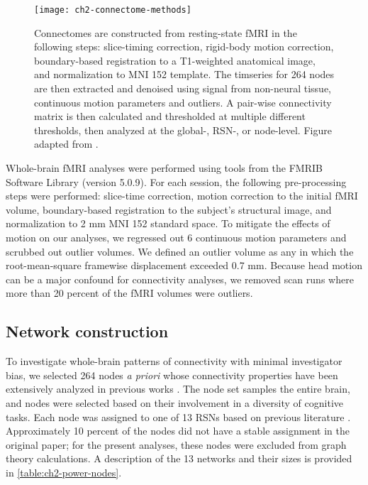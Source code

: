 \begin{figure}[t]
    \centering
    \texttt{[image: ch2-connectome-methods]}
    \caption[Schematic for connectome construction.]{Connectomes are constructed from resting-state fMRI in the following steps: slice-timing correction, rigid-body motion correction, boundary-based registration to a T1-weighted anatomical image, and normalization to MNI 152 template. The timseries for 264 nodes are then extracted and denoised using signal from non-neural tissue, continuous motion parameters and outliers. A pair-wise connectivity matrix is then calculated and thresholded at multiple different thresholds, then analyzed at the global-, RSN-, or node-level. Figure adapted from \citep{Yang2018}.}
    \label{fig:ch2-connectome-methods}
\end{figure}

Whole-brain fMRI analyses were performed using tools from the FMRIB Software Library (version 5.0.9). For each session, the following pre-processing steps were performed:  slice-time correction, motion correction to the initial fMRI volume, boundary-based registration to the subject's structural image, and normalization to 2 mm MNI 152 standard space. To mitigate the effects of motion on our analyses, we regressed out 6 continuous motion parameters and scrubbed out outlier volumes. We defined an outlier volume as any in which the root-mean-square framewise displacement exceeded 0.7 mm. Because head motion can be a major confound for connectivity analyses, we removed scan runs where more than 20 percent of the fMRI volumes were outliers.

\subsection{Network construction}

To investigate whole-brain patterns of connectivity with minimal investigator bias, we selected 264 nodes \textit{a priori} whose connectivity properties have been extensively analyzed in previous works \citep{Power2011}. The node set samples the entire brain, and nodes were selected based on their involvement in a diversity of cognitive tasks. Each node was assigned to one of 13 RSNs based on previous literature \citep{Power2013}. Approximately 10 percent of the nodes did not have a stable assignment in the original paper; for the present analyses, these nodes were excluded from graph theory calculations. A description of the 13 networks and their sizes is provided in \ref{table:ch2-power-nodes}. 

